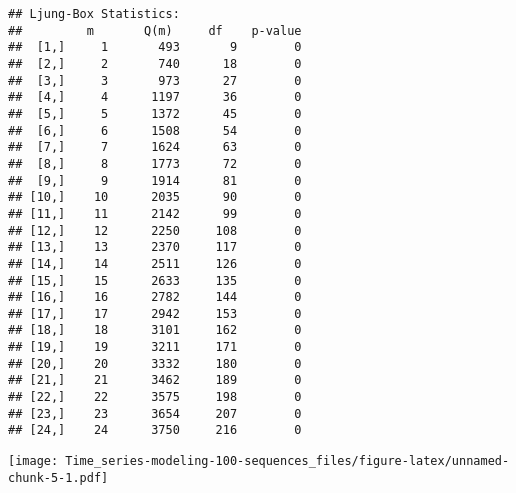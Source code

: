 \documentclass[
]{article}
\newenvironment{Shaded}{\begin{snugshade}}{\end{snugshade}}
\newcommand{\AttributeTok}[1]{\textcolor[rgb]{0.13,0.29,0.53}{#1}}
\newcommand{\CommentTok}[1]{\textcolor[rgb]{0.56,0.35,0.01}{\textit{#1}}}
\newcommand{\DecValTok}[1]{\textcolor[rgb]{0.00,0.00,0.81}{#1}}
\newcommand{\FunctionTok}[1]{\textcolor[rgb]{0.13,0.29,0.53}{\textbf{#1}}}
\newcommand{\NormalTok}[1]{#1}
\newcommand{\OtherTok}[1]{\textcolor[rgb]{0.56,0.35,0.01}{#1}}
\newcommand{\SpecialCharTok}[1]{\textcolor[rgb]{0.81,0.36,0.00}{\textbf{#1}}}
\newcommand{\StringTok}[1]{\textcolor[rgb]{0.31,0.60,0.02}{#1}}
\begin{document}
\begin{Shaded}
\end{Shaded}

\begin{verbatim}
## Ljung-Box Statistics:  
##         m       Q(m)     df    p-value
##  [1,]     1       493       9        0
##  [2,]     2       740      18        0
##  [3,]     3       973      27        0
##  [4,]     4      1197      36        0
##  [5,]     5      1372      45        0
##  [6,]     6      1508      54        0
##  [7,]     7      1624      63        0
##  [8,]     8      1773      72        0
##  [9,]     9      1914      81        0
## [10,]    10      2035      90        0
## [11,]    11      2142      99        0
## [12,]    12      2250     108        0
## [13,]    13      2370     117        0
## [14,]    14      2511     126        0
## [15,]    15      2633     135        0
## [16,]    16      2782     144        0
## [17,]    17      2942     153        0
## [18,]    18      3101     162        0
## [19,]    19      3211     171        0
## [20,]    20      3332     180        0
## [21,]    21      3462     189        0
## [22,]    22      3575     198        0
## [23,]    23      3654     207        0
## [24,]    24      3750     216        0
\end{verbatim}

\texttt{[image: Time\_series-modeling-100-sequences\_files/figure-latex/unnamed-chunk-5-1.pdf]}
\end{document}
